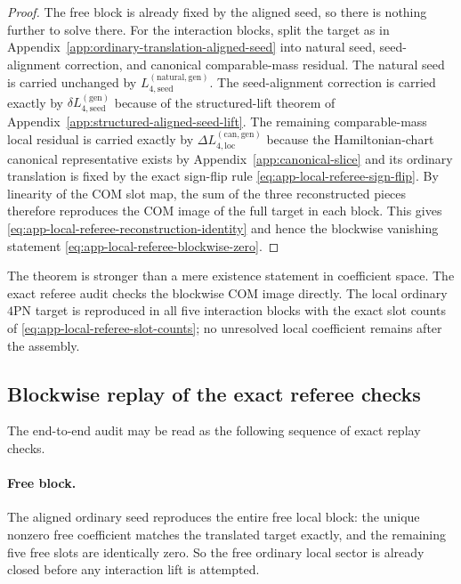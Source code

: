 \documentclass[11pt]{article}
\begin{document}
\begin{proof}
The free block is already fixed by the aligned seed, so there is nothing further
to solve there.  For the interaction blocks, split the target as in
Appendix~\ref{app:ordinary-translation-aligned-seed} into natural seed,
seed-alignment correction, and canonical comparable-mass residual.  The natural
seed is carried unchanged by
$L_{4,\mathrm{seed}}^{(\mathrm{natural,gen})}$.  The seed-alignment correction is
carried exactly by $\delta L_{4,\mathrm{seed}}^{(\mathrm{gen})}$ because of the
structured-lift theorem of
Appendix~\ref{app:structured-aligned-seed-lift}.  The remaining
comparable-mass local residual is carried exactly by
$\Delta L_{4,\mathrm{loc}}^{(\mathrm{can,gen})}$ because the Hamiltonian-chart
canonical representative exists by Appendix~\ref{app:canonical-slice} and its
ordinary translation is fixed by the exact sign-flip rule
\eqref{eq:app-local-referee-sign-flip}.  By linearity of the COM slot map, the
sum of the three reconstructed pieces therefore reproduces the COM image of the
full target in each block.  This gives
\eqref{eq:app-local-referee-reconstruction-identity} and hence the blockwise
vanishing statement \eqref{eq:app-local-referee-blockwise-zero}.
\end{proof}

The theorem is stronger than a mere existence statement in coefficient space.
The exact referee audit checks the blockwise COM image directly.  The local
ordinary $4$PN target is reproduced in all five interaction blocks with the
exact slot counts of \eqref{eq:app-local-referee-slot-counts}; no unresolved
local coefficient remains after the assembly.

\subsection{Blockwise replay of the exact referee checks}
\label{app:local-referee-reconstruction-blockwise}

The end-to-end audit may be read as the following sequence of exact replay
checks.

\paragraph{Free block.}
The aligned ordinary seed reproduces the entire free local block: the unique
nonzero free coefficient matches the translated target exactly, and the
remaining five free slots are identically zero.  So the free ordinary local
sector is already closed before any interaction lift is attempted.
\end{document}
